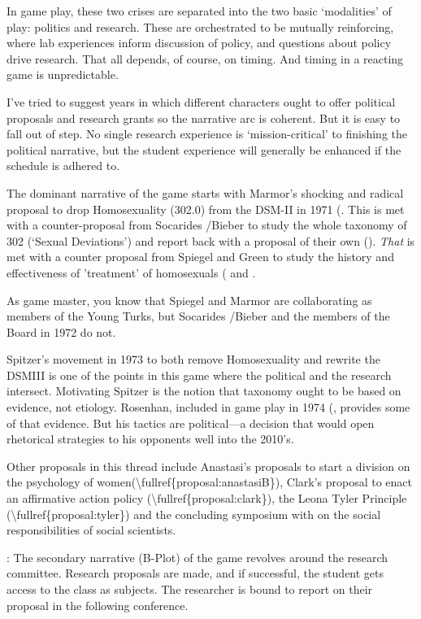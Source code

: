 \begin{refsection}
In game play, these two crises are separated into the two basic ‘modalities’ of play: politics and research. These are orchestrated to be mutually reinforcing, where lab experiences inform discussion of policy, and questions about policy drive research. That all depends, of course, on timing. And timing in a reacting game is unpredictable.

I’ve tried to suggest years in which different characters ought to offer political proposals and research grants so the narrative arc is coherent. But it is easy to fall out of step. No single research experience is ‘mission-critical’ to finishing the political narrative, but the student experience will generally be enhanced if the schedule is adhered to.

 The dominant narrative of the game starts with Marmor’s shocking and radical proposal to drop Homosexuality (302.0) from the DSM-II in 1971 (. This is met with a counter-proposal from Socarides \slash  Bieber to study the whole taxonomy of 302 (‘Sexual Deviations’) and report back with a proposal of their own (). \emph{That} is met with a counter proposal from Spiegel and Green to study the history and effectiveness of ’treatment’ of homosexuals ( and . 

As game master, you know that Spiegel and Marmor are collaborating as members of the Young Turks, but Socarides \slash  Bieber and the members of the Board in 1972 do not.

Spitzer’s movement in 1973 to both remove Homosexuality and rewrite the DSMIII is one of the points in this game where the political and the research intersect. Motivating Spitzer is the notion that taxonomy ought to be based on evidence, not etiology. Rosenhan, included in game play in 1974 (, provides some of that evidence. But his tactics are political---a decision that would open rhetorical strategies to his opponents well into the 2010’s. 

Other proposals in this thread include Anastasi’s proposals to start a division on the psychology of women(\textbackslash{}fullref\{proposal:anastasiB\}), Clark’s proposal to enact an affirmative action policy (\textbackslash{}fullref\{proposal:clark\}), the Leona Tyler Principle (\textbackslash{}fullref\{proposal:tyler\}) and the concluding symposium with on the social responsibilities of social scientists.

: The secondary narrative (B-Plot) of the game revolves around the research committee. Research proposals are made, and if successful, the student gets access to the class as subjects. The researcher is bound to report on their proposal in the following conference. 


\end{refsection}
